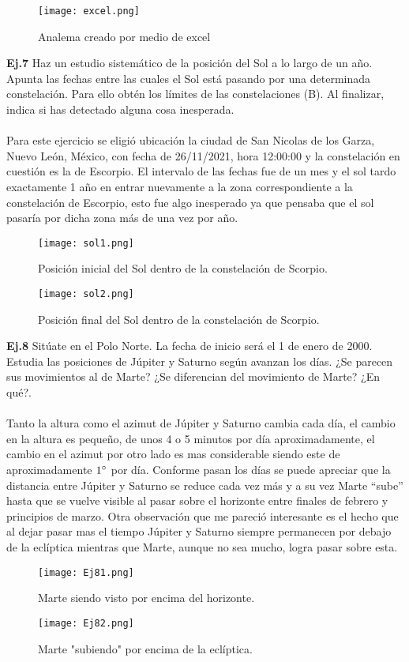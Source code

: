 \documentclass[12pt,letterpaper]{article}
\begin{document}
\begin{figure}[H]
\centering
\texttt{[image: excel.png]}
\caption{Analema creado por medio de excel}
\end{figure}
\newpage
\textbf{Ej.7} Haz un estudio sistemático de la posición del Sol a lo largo de un año. Apunta las fechas entre las cuales el Sol está pasando por una determinada constelación. Para ello obtén los límites de las constelaciones (B). Al finalizar, indica si has detectado alguna cosa inesperada.\\\\
Para este ejercicio se eligió ubicación la ciudad de San Nicolas de los Garza, Nuevo León, México, con fecha de 26/11/2021, hora 12:00:00 y la constelación en cuestión es la de Escorpio. El intervalo de las fechas fue de un mes y el sol tardo exactamente 1 año en entrar nuevamente a la zona correspondiente a la constelación de Escorpio, esto fue algo inesperado ya que pensaba que el sol pasaría por dicha zona más de una vez por año.
\begin{figure}[H]
\centering
\texttt{[image: sol1.png]}
\caption{Posición inicial del Sol dentro de la constelación de Scorpio.}
\vspace{0.3cm}
\texttt{[image: sol2.png]}
\caption{Posición final del Sol dentro de la constelación de Scorpio.}
\end{figure}
\textbf{Ej.8} Sitúate en el Polo Norte. La fecha de inicio será el 1 de enero de 2000. Estudia las posiciones de Júpiter y Saturno según avanzan los días. ¿Se parecen sus movimientos al de Marte? ¿Se diferencian del movimiento de Marte? ¿En qué?.\\\\
Tanto la altura como el azimut de Júpiter y Saturno cambia cada día, el cambio en la altura es pequeño, de unos 4 o 5 minutos por día aproximadamente, el cambio en el azimut por otro lado es mas considerable siendo este de aproximadamente $1\degree$ por día. Conforme pasan los días se puede apreciar que la distancia entre Júpiter y Saturno se reduce cada vez más y a su vez Marte “sube” hasta que se vuelve visible al pasar sobre el horizonte entre finales de febrero y principios de marzo. Otra observación que me pareció interesante es el hecho que al dejar pasar mas el tiempo Júpiter y Saturno siempre permanecen por debajo de la eclíptica mientras que Marte, aunque no sea mucho, logra pasar sobre esta.
\begin{figure}[H]
\centering
\texttt{[image: Ej81.png]}
\caption{Marte siendo visto por encima del horizonte.}
\vspace{0.3cm}
\texttt{[image: Ej82.png]}
\caption{Marte "subiendo" por encima de la eclíptica.}
\end{figure}
\end{document}

